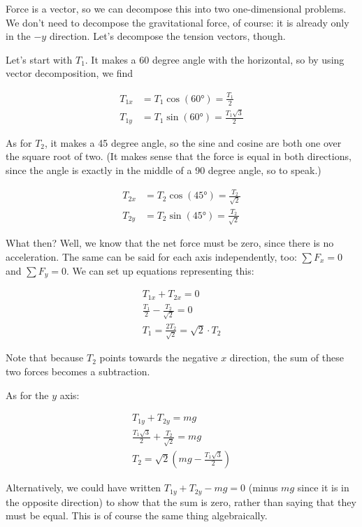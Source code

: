 \documentclass[12pt,a4paper]{report}
\begin{document}
Force is a vector, so we can decompose this into two one-dimensional problems. We don't need to decompose the gravitational force, of course: it is already only in the $-y$ direction. Let's decompose the tension vectors, though.

Let's start with $T_1$. It makes a 60 degree angle with the horizontal, so by using vector decomposition, we find

\begin{align}
T_{1x} &= T_1 \cos(\ang{60}) = \frac{T_1}{2}\\
T_{1y} &= T_1 \sin(\ang{60}) = \frac{T_1 \sqrt{3}}{2}
\end{align}

As for $T_2$, it makes a 45 degree angle, so the sine and cosine are both one over the square root of two. (It makes sense that the force is equal in both directions, since the angle is exactly in the middle of a 90 degree angle, so to speak.)

\begin{align}
T_{2x} &= T_2 \cos(\ang{45}) = \frac{T_2}{\sqrt{2}}\\
T_{2y} &= T_2 \sin(\ang{45}) = \frac{T_2}{\sqrt{2}}
\end{align}

What then? Well, we know that the net force must be zero, since there is no acceleration. The same can be said for each axis independently, too: $\sum F_x = 0$ and $\sum F_y = 0$. We can set up equations representing this:

\begin{align}
T_{1x} + T_{2x} = 0\\
\frac{T_1}{2} - \frac{T_2}{\sqrt{2}} = 0\\
T_1 = \frac{2 T_2}{\sqrt{2}} = \sqrt{2} \cdot T_2 \label{eq:lec6_t1}
\end{align}

Note that because $T_2$ points towards the negative $x$ direction, the sum of these two forces becomes a subtraction.

As for the $y$ axis:

\begin{align}
T_{1y} + T_{2y} = m g\\
\frac{T_1 \sqrt{3}}{2} + \frac{T_2}{\sqrt{2}} = m g\\
T_2 = \sqrt{2}\left(m g - \frac{T_1 \sqrt{3}}{2}\right)
\end{align}

Alternatively, we could have written $T_{1y} + T_{2y} - m g = 0$ (minus $m g$ since it is in the opposite direction) to show that the sum is zero, rather than saying that they must be equal. This is of course the same thing algebraically.
\end{document}
